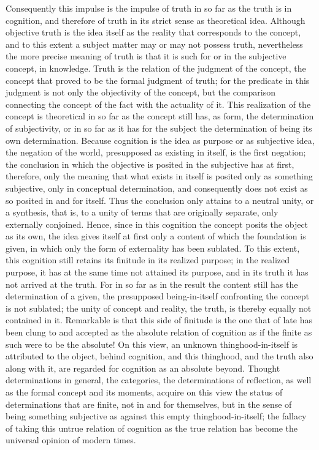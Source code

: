 Consequently this impulse is
the impulse of truth in so far as
the truth is in cognition,
and therefore of truth in its strict sense
as theoretical idea.
Although objective truth is
the idea itself as the reality
that corresponds to the concept,
and to this extent a subject matter
may or may not possess truth,
nevertheless the more precise meaning of truth is
that it is such for or in
the subjective concept, in knowledge.
Truth is the relation of the
judgment of the concept,
the concept that proved to be
the formal judgment of truth;
for the predicate in this judgment is
not only the objectivity of the concept,
but the comparison connecting
the concept of the fact
with the actuality of it.
This realization of the concept is theoretical
in so far as the concept still has, as form,
the determination of subjectivity, or in so far
as it has for the subject the determination of
being its own determination.
Because cognition is the idea as purpose
or as subjective idea,
the negation of the world,
presupposed as existing in itself,
is the first negation;
the conclusion in which the objective is posited
in the subjective has at first, therefore,
only the meaning that what exists in itself is
posited only as something subjective,
only in conceptual determination,
and consequently does not exist as
so posited in and for itself.
Thus the conclusion only attains
to a neutral unity, or a synthesis,
that is, to a unity of terms that
are originally separate, only externally conjoined.
Hence, since in this cognition the concept
posits the object as its own,
the idea gives itself at first
only a content of which the foundation is given,
in which only the form of externality has been sublated.
To this extent, this cognition still retains
its finitude in its realized purpose;
in the realized purpose, it has at the same time
not attained its purpose,
and in its truth it has not arrived at the truth.
For in so far as in the result
the content still has
the determination of a given,
the presupposed being-in-itself confronting
the concept is not sublated;
the unity of concept and reality, the truth,
is thereby equally not contained in it.
Remarkable is that this side of finitude is
the one that of late has been clung to
and accepted as the absolute relation of cognition
as if the finite as such were to be the absolute!
On this view, an unknown thinghood-in-itself is
attributed to the object, behind cognition,
and this thinghood, and the truth also along with it,
are regarded for cognition as an absolute beyond.
Thought determinations in general, the categories,
the determinations of reflection,
as well as the formal concept and its moments,
acquire on this view the status of
determinations that are finite,
not in and for themselves,
but in the sense of being
something subjective as against
this empty thinghood-in-itself;
the fallacy of taking this
untrue relation of cognition as
the true relation has become
the universal opinion of modern times.


